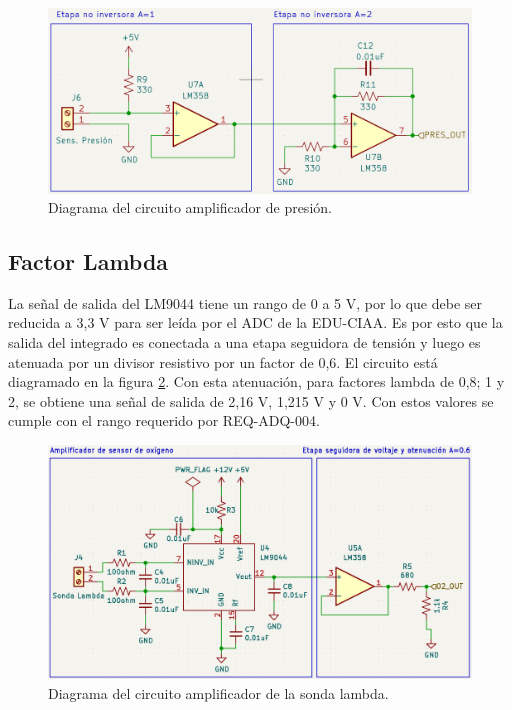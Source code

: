 \begin{figure}[htpb]
\centering
\includegraphics[width=\textwidth]{./Figures/circuito-presion.png}
\caption{Diagrama del circuito amplificador de presión.}
\label{fig:circuito-presion}
\end{figure}
\break
\subsection{Factor Lambda}

La señal de salida del LM9044 tiene un rango de 0 a 5 V, por lo que debe ser reducida a 3,3 V para ser leída por el ADC de la EDU-CIAA. Es por esto que la salida del integrado es conectada a una etapa seguidora de tensión y luego es atenuada por un divisor resistivo por un factor de 0,6. El circuito está diagramado en la figura \ref{fig:circuito-o2}. Con esta atenuación, para factores lambda de 0,8; 1 y 2, se obtiene una señal de salida de 2,16 V, 1,215 V y 0 V. Con estos valores se cumple con el rango requerido por REQ-ADQ-004.

\begin{figure}[htpb]
\centering
\includegraphics[width=\textwidth]{./Figures/ampli-o2.png}
\caption{Diagrama del circuito amplificador de la sonda lambda.}
\label{fig:circuito-o2}
\end{figure}

